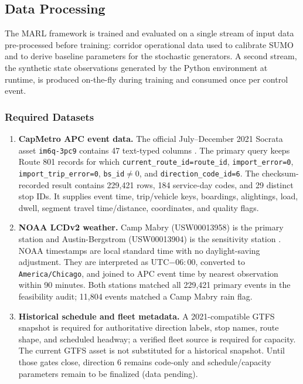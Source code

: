 \subsection{Data Processing}

The MARL framework is trained and evaluated on a single stream of input data pre-processed before training: corridor operational data used to calibrate SUMO and to derive baseline parameters for the stochastic generators. A second stream, the synthetic state observations generated by the Python environment at runtime, is produced on-the-fly during training and consumed once per control event.

\subsubsection{Required Datasets}

\begin{enumerate}
\item \textbf{CapMetro APC event data.} The official July--December 2021 Socrata asset \texttt{im6q-3pc9} contains 47 text-typed columns \cite{TexasCapMetroAPC2021}. The primary query keeps Route 801 records for which \texttt{current\_route\_id=route\_id}, \texttt{import\_error=0}, \texttt{import\_trip\_error=0}, \texttt{bs\_id}$\neq 0$, and \texttt{direction\_code\_id=6}. The checksum-recorded result contains 229{,}421 rows, 184 service-day codes, and 29 distinct stop IDs. It supplies event time, trip/vehicle keys, boardings, alightings, load, dwell, segment travel time/distance, coordinates, and quality flags.

\item \textbf{NOAA LCDv2 weather.} Camp Mabry (USW00013958) is the primary station and Austin-Bergstrom (USW00013904) is the sensitivity station \cite{NOAALCDv2}. NOAA timestamps are local standard time with no daylight-saving adjustment. They are interpreted as UTC$-06{:}00$, converted to \texttt{America/Chicago}, and joined to APC event time by nearest observation within 90 minutes. Both stations matched all 229{,}421 primary events in the feasibility audit; 11{,}804 events matched a Camp Mabry rain flag.

\item \textbf{Historical schedule and fleet metadata.} A 2021-compatible GTFS snapshot is required for authoritative direction labels, stop names, route shape, and scheduled headway; a verified fleet source is required for capacity. The current GTFS asset \cite{CapMetroGTFS} is not substituted for a historical snapshot. Until those gates close, direction 6 remains code-only and schedule/capacity parameters remain to be finalized (data pending).
\end{enumerate}


